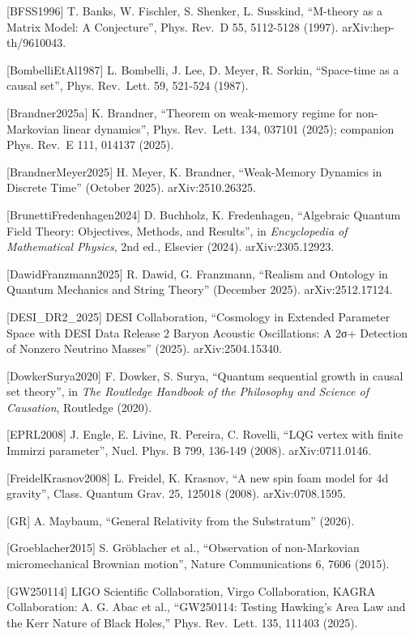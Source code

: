 \documentclass[
]{article}
\begin{document}
{[}BFSS1996{]} T. Banks, W. Fischler, S. Shenker, L. Susskind,
``M-theory as a Matrix Model: A Conjecture'', Phys. Rev.~D 55, 5112-5128
(1997). arXiv:hep-th/9610043.

{[}BombelliEtAl1987{]} L. Bombelli, J. Lee, D. Meyer, R. Sorkin,
``Space-time as a causal set'', Phys. Rev.~Lett. 59, 521-524 (1987).

{[}Brandner2025a{]} K. Brandner, ``Theorem on weak-memory regime for
non-Markovian linear dynamics'', Phys. Rev.~Lett. 134, 037101 (2025);
companion Phys. Rev.~E 111, 014137 (2025).

{[}BrandnerMeyer2025{]} H. Meyer, K. Brandner, ``Weak-Memory Dynamics in
Discrete Time'' (October 2025). arXiv:2510.26325.

{[}BrunettiFredenhagen2024{]} D. Buchholz, K. Fredenhagen, ``Algebraic
Quantum Field Theory: Objectives, Methods, and Results'', in
\emph{Encyclopedia of Mathematical Physics}, 2nd ed., Elsevier (2024).
arXiv:2305.12923.

{[}DawidFranzmann2025{]} R. Dawid, G. Franzmann, ``Realism and Ontology
in Quantum Mechanics and String Theory'' (December 2025).
arXiv:2512.17124.

{[}DESI\_DR2\_2025{]} DESI Collaboration, ``Cosmology in Extended
Parameter Space with DESI Data Release 2 Baryon Acoustic Oscillations: A
2σ+ Detection of Nonzero Neutrino Masses'' (2025). arXiv:2504.15340.

{[}DowkerSurya2020{]} F. Dowker, S. Surya, ``Quantum sequential growth
in causal set theory'', in \emph{The Routledge Handbook of the
Philosophy and Science of Causation}, Routledge (2020).

{[}EPRL2008{]} J. Engle, E. Livine, R. Pereira, C. Rovelli, ``LQG vertex
with finite Immirzi parameter'', Nucl. Phys. B 799, 136-149 (2008).
arXiv:0711.0146.

{[}FreidelKrasnov2008{]} L. Freidel, K. Krasnov, ``A new spin foam model
for 4d gravity'', Class. Quantum Grav. 25, 125018 (2008).
arXiv:0708.1595.

{[}GR{]} A. Maybaum, ``General Relativity from the Substratum'' (2026).

{[}Groeblacher2015{]} S. Gröblacher et al., ``Observation of
non-Markovian micromechanical Brownian motion'', Nature Communications
6, 7606 (2015).

{[}GW250114{]} LIGO Scientific Collaboration, Virgo Collaboration, KAGRA
Collaboration: A. G. Abac et al., ``GW250114: Testing Hawking's Area Law
and the Kerr Nature of Black Holes,'' Phys. Rev.~Lett. 135, 111403
(2025).
\end{document}
